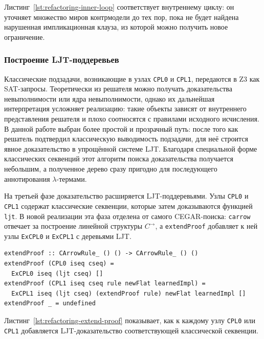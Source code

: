 \documentclass[14pt, russian]{scrartcl}
\begin{document}
Листинг~\ref{lst:refactoring-inner-loop} соответствует внутреннему циклу:
он уточняет множество миров контрмодели до тех пор, пока не будет найдена
нарушенная импликационная клауза, из которой можно получить новое ограничение.

\subsubsection{Построение LJT-поддеревьев}

Классические подзадачи, возникающие в узлах \texttt{CPL0} и \texttt{CPL1},
передаются в Z3 как SAT-запросы. Теоретически из решателя можно получать
доказательства невыполнимости или ядра невыполнимости, однако их дальнейшая
интерпретация усложняет реализацию: такие объекты зависят от внутреннего
представления решателя и плохо соотносятся с правилами исходного исчисления. В
данной работе выбран более простой и прозрачный путь: после того как решатель
подтвердил классическую выводимость подзадачи, для неё строится явное
доказательство в упрощённой системе LJT. Благодаря специальной форме классических
секвенций этот алгоритм поиска доказательства получается небольшим, а полученное
дерево сразу пригодно для последующего аннотирования $\lambda$-термами.

На третьей фазе доказательство расширяется LJT-поддеревьями. Узлы
\texttt{CPL0} и \texttt{CPL1} содержат классические секвенции, которые затем
доказываются функцией \texttt{ljt}. В новой реализации эта фаза отделена от
самого CEGAR-поиска: \texttt{carrow} отвечает за построение линейной структуры
$C^{\rightarrow}$, а \texttt{extendProof} добавляет к ней узлы
\texttt{ExCPL0} и \texttt{ExCPL1} с деревьями LJT.

\begin{listing}[!htb]
\caption{Добавление LJT-поддеревьев к доказательству $C^{\rightarrow}$}
\label{lst:refactoring-extend-proof}
\begin{verbatim}
extendProof :: CArrowRule_ () () -> CArrowRule_ () ()
extendProof (CPL0 iseq cseq) =
  ExCPL0 iseq (ljt cseq) []
extendProof (CPL1 iseq cseq rule newFlat learnedImpl) =
  ExCPL1 iseq (ljt cseq) (extendProof rule) newFlat learnedImpl []
extendProof _ = undefined
\end{verbatim}
\end{listing}

Листинг~\ref{lst:refactoring-extend-proof} показывает, как к каждому узлу
\texttt{CPL0} или \texttt{CPL1} добавляется LJT-доказательство соответствующей
классической секвенции.
\end{document}
